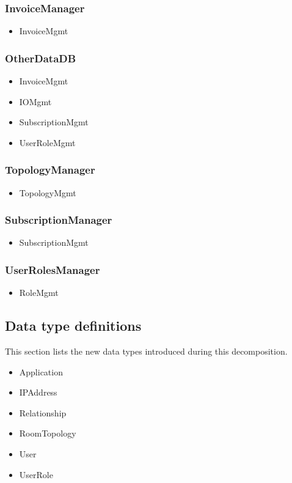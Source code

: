     \subsubsection{InvoiceManager}
        \begin{itemize}
            \item InvoiceMgmt
        \end{itemize}

    \subsubsection{OtherDataDB}
        \begin{itemize}
            \item InvoiceMgmt
            \item IOMgmt
            \item SubscriptionMgmt
            \item UserRoleMgmt
        \end{itemize}

    \subsubsection{TopologyManager}
        \begin{itemize}
            \item TopologyMgmt
        \end{itemize}

    \subsubsection{SubscriptionManager}
        \begin{itemize}
            \item SubscriptionMgmt
        \end{itemize}

    \subsubsection{UserRolesManager}
        \begin{itemize}
            \item RoleMgmt
        \end{itemize}


\subsection{Data type definitions}
    This section lists the new data types introduced during this decomposition.

    \begin{itemize}
        \item Application
        \item IPAddress
        \item Relationship
        \item RoomTopology
        \item User
        \item UserRole
    \end{itemize}

